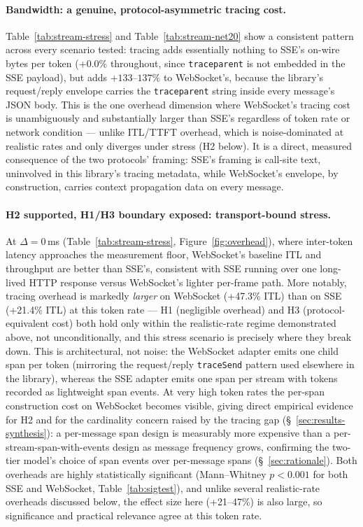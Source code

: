 \documentclass[11pt]{article}
\begin{document}
\paragraph{Bandwidth: a genuine, protocol-asymmetric tracing cost.} Table~\ref{tab:stream-stress} and Table~\ref{tab:stream-net20} show a consistent pattern across every scenario tested: tracing adds essentially nothing to SSE's on-wire bytes per token ($+0.0\%$ throughout, since \texttt{traceparent} is not embedded in the SSE payload), but adds $+133$--$137\%$ to WebSocket's, because the library's request/reply envelope carries the \texttt{traceparent} string inside every message's JSON body. This is the one overhead dimension where WebSocket's tracing cost is unambiguously and substantially larger than SSE's regardless of token rate or network condition --- unlike ITL/TTFT overhead, which is noise-dominated at realistic rates and only diverges under stress (H2 below). It is a direct, measured consequence of the two protocols' framing: SSE's framing is call-site text, uninvolved in this library's tracing metadata, while WebSocket's envelope, by construction, carries context propagation data on every message.

\paragraph{H2 supported, H1/H3 boundary exposed: transport-bound stress.} At $\Delta=0$\,ms (Table~\ref{tab:stream-stress}, Figure~\ref{fig:overhead}), where inter-token latency approaches the measurement floor, WebSocket's baseline ITL and throughput are better than SSE's, consistent with SSE running over one long-lived HTTP response versus WebSocket's lighter per-frame path. More notably, tracing overhead is markedly \emph{larger} on WebSocket (+47.3\% ITL) than on SSE (+21.4\% ITL) at this token rate --- H1 (negligible overhead) and H3 (protocol-equivalent cost) both hold only within the realistic-rate regime demonstrated above, not unconditionally, and this stress scenario is precisely where they break down. This is architectural, not noise: the WebSocket adapter emits one child span per token (mirroring the request/reply \texttt{traceSend} pattern used elsewhere in the library), whereas the SSE adapter emits one span per stream with tokens recorded as lightweight span events. At very high token rates the per-span construction cost on WebSocket becomes visible, giving direct empirical evidence for H2 and for the cardinality concern raised by the tracing gap (\S~\ref{sec:results-synthesis}): a per-message span design is measurably more expensive than a per-stream-span-with-events design as message frequency grows, confirming the two-tier model's choice of span events over per-message spans (\S~\ref{sec:rationale}). Both overheads are highly statistically significant (Mann--Whitney $p<0.001$ for both SSE and WebSocket, Table~\ref{tab:sigtest}), and unlike several realistic-rate overheads discussed below, the effect size here (+21--47\%) is also large, so significance and practical relevance agree at this token rate.
\end{document}
